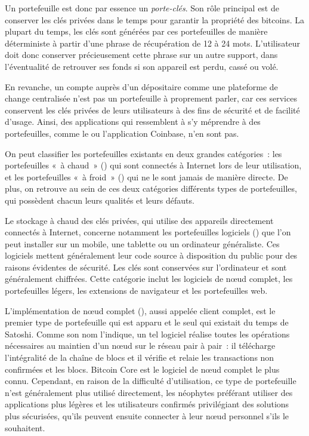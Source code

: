 Un portefeuille est donc par essence un \emph{porte-clés}. Son rôle principal est de conserver les clés privées dans le temps pour garantir la propriété des bitcoins. La plupart du temps, les clés sont générées par ces portefeuilles de manière déterministe à partir d'une phrase de récupération de 12 à 24 mots. L'utilisateur doit donc conserver précieusement cette phrase sur un autre support, dans l'éventualité de retrouver ses fonds si son appareil est perdu, cassé ou volé.

En revanche, un compte auprès d'un dépositaire comme une plateforme de change centralisée n'est pas un portefeuille à proprement parler, car ces services conservent les clés privées de leurs utilisateurs à des fins de sécurité et de facilité d'usage. Ainsi, des applications qui ressemblent à s'y méprendre à des portefeuilles, comme le  ou l'application Coinbase, n'en sont pas.

On peut classifier les portefeuilles existants en deux grandes catégories~: les portefeuilles «~à chaud~» () qui sont connectés à Internet lors de leur utilisation, et les portefeuilles «~à froid~» () qui ne le sont jamais de manière directe. De plus, on retrouve au sein de ces deux catégories différents types de portefeuilles, qui possèdent chacun leurs qualités et leurs défauts.


Le stockage à chaud des clés privées, qui utilise des appareils directement connectés à Internet, concerne notamment les portefeuilles logiciels () que l'on peut installer sur un mobile, une tablette ou un ordinateur généraliste. Ces logiciels mettent généralement leur code source à disposition du public pour des raisons évidentes de sécurité. Les clés sont conservées sur l'ordinateur et sont généralement chiffrées. Cette catégorie inclut les logiciels de nœud complet, les portefeuilles légers, les extensions de navigateur et les portefeuilles web.

L'implémentation de nœud complet (), aussi appelée client complet, est le premier type de portefeuille qui est apparu et le seul qui existait du temps de Satoshi. Comme son nom l'indique, un tel logiciel réalise toutes les opérations nécessaires au maintien d'un nœud sur le réseau pair à pair~: il télécharge l'intégralité de la chaîne de blocs et il vérifie et relaie les transactions non confirmées et les blocs. Bitcoin Core est le logiciel de nœud complet le plus connu. Cependant, en raison de la difficulté d'utilisation, ce type de portefeuille n'est généralement plus utilisé directement, les néophytes préférant utiliser des applications plus légères et les utilisateurs confirmés privilégiant des solutions plus sécurisées, qu'ils peuvent ensuite connecter à leur nœud personnel s'ils le souhaitent.

